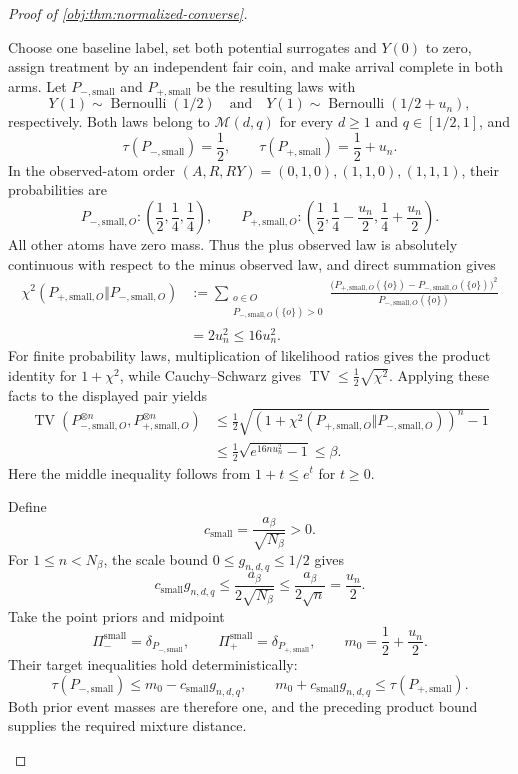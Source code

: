 \begin{proof}[Proof of \cref{obj:thm:normalized-converse}]
\begin{enumerate}
Choose one baseline label, set both potential surrogates and \(Y(0)\) to zero, assign treatment by an independent fair coin, and make arrival complete in both arms. Let
\(P_{-,\mathrm{small}}\) and \(P_{+,\mathrm{small}}\) be the resulting laws with
\[
Y(1)\sim\operatorname{Bernoulli}(1/2)
\quad\text{and}\quad
Y(1)\sim\operatorname{Bernoulli}(1/2+u_n),
\]
respectively. Both laws belong to \(\mathcal M(d,q)\) for every \(d\ge1\) and \(q\in[1/2,1]\), and
\[
\tau(P_{-,\mathrm{small}})=\frac12,
\qquad
\tau(P_{+,\mathrm{small}})=\frac12+u_n.
\]
In the observed-atom order
\((A,R,RY)=(0,1,0),(1,1,0),(1,1,1)\), their probabilities are
\[
P_{-,\mathrm{small},O}:
\left(\frac12,\frac14,\frac14\right),
\qquad
P_{+,\mathrm{small},O}:
\left(\frac12,\frac14-\frac{u_n}{2},
                 \frac14+\frac{u_n}{2}\right).
\]
All other atoms have zero mass. Thus the plus observed law is absolutely continuous with respect to the minus observed law, and direct summation gives
\[
\begin{aligned}
\chi^2(P_{+,\mathrm{small},O}\Vert P_{-,\mathrm{small},O})
&:=
\sum_{\substack{o\in O\\
P_{-,\mathrm{small},O}(\{o\})>0}}
\frac{
\bigl(P_{+,\mathrm{small},O}(\{o\})
-P_{-,\mathrm{small},O}(\{o\})\bigr)^2}
{P_{-,\mathrm{small},O}(\{o\})}\\
&=2u_n^2\le16u_n^2.
\end{aligned}
\]
For finite probability laws, multiplication of likelihood ratios gives the product identity for \(1+\chi^2\), while Cauchy--Schwarz gives
\(\operatorname{TV}\le\frac12\sqrt{\chi^2}\).
Applying these facts to the displayed pair yields
\[
\begin{aligned}
\operatorname{TV}
\left(P_{-,\mathrm{small},O}^{\otimes n},
      P_{+,\mathrm{small},O}^{\otimes n}\right)
&\le
\frac12\sqrt{
\left(1+
\chi^2(P_{+,\mathrm{small},O}\Vert
       P_{-,\mathrm{small},O})\right)^n-1}\\
&\le\frac12\sqrt{e^{16nu_n^2}-1}
\le\beta.
\end{aligned}
\]
Here the middle inequality follows from \(1+t\le e^t\) for \(t\ge0\).

Define
\[
c_{\mathrm{small}}=\frac{a_\beta}{\sqrt{N_\beta}}>0.
\]
For \(1\le n<N_\beta\), the scale bound
\(0\le g_{n,d,q}\le1/2\) gives
\[
c_{\mathrm{small}}g_{n,d,q}
\le\frac{a_\beta}{2\sqrt{N_\beta}}
\le\frac{a_\beta}{2\sqrt n}
=\frac{u_n}{2}.
\]
Take the point priors and midpoint
\[
\Pi_-^{\mathrm{small}}=\delta_{P_{-,\mathrm{small}}},
\qquad
\Pi_+^{\mathrm{small}}=\delta_{P_{+,\mathrm{small}}},
\qquad
m_0=\frac12+\frac{u_n}{2}.
\]
Their target inequalities hold deterministically:
\[
\tau(P_{-,\mathrm{small}})
\le m_0-c_{\mathrm{small}}g_{n,d,q},
\qquad
m_0+c_{\mathrm{small}}g_{n,d,q}
\le\tau(P_{+,\mathrm{small}}).
\]
Both prior event masses are therefore one, and the preceding product bound supplies the required mixture distance.


\end{enumerate}
\end{proof}
